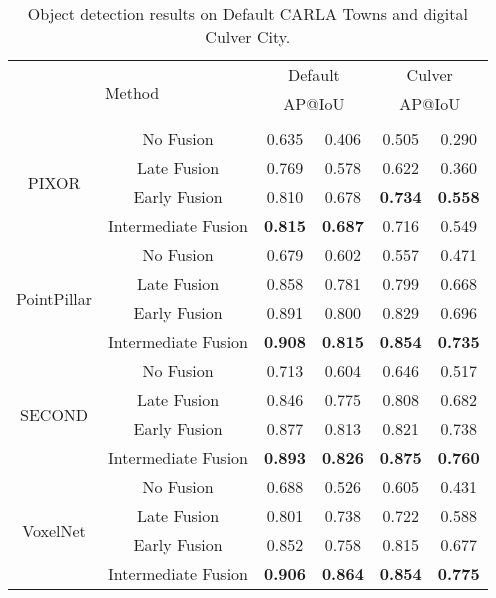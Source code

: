 \documentclass[letterpaper, 10 pt, conference]{ieeeconf}
\begin{document}
\begin{table}[]
    \centering
    \caption{Object detection results on Default CARLA Towns and digital Culver City.}
    \begin{tabular}{c|c|cc|cc}
        \toprule
        \multicolumn{2}{c|}{\multirow{3}{*}{Method}}&\multicolumn{2}{c|}{Default}&\multicolumn{2}{c}{Culver}\\
        \multicolumn{2}{c|}{}&\multicolumn{2}{c|}{AP@IoU}&\multicolumn{2}{c}{AP@IoU}\\
         \multicolumn{2}{c|}{}&&&& \\
         \hline
        \multirow{4}{*}{PIXOR}&No Fusion&0.635 &0.406 &0.505&0.290\\
        &Late Fusion&0.769&0.578&0.622&0.360\\
        &Early Fusion&0.810&0.678&\textbf{0.734}&\textbf{0.558}\\
        &Intermediate Fusion&\textbf{0.815}&\textbf{0.687}&0.716&0.549\\
        \hline
        \multirow{4}{*}{PointPillar}&No Fusion&0.679&0.602&0.557&0.471\\
        &Late Fusion&0.858&0.781&0.799&0.668\\
        &Early Fusion&0.891&0.800&0.829&0.696\\
        &Intermediate Fusion&\textbf{0.908}&\textbf{0.815}&\textbf{0.854}&\textbf{0.735}\\
        \hline
        \multirow{4}{*}{SECOND}&No Fusion&0.713&0.604&0.646&0.517\\
        &Late Fusion&0.846&0.775&0.808&0.682\\
        &Early Fusion&0.877&0.813&0.821&0.738\\
        &Intermediate Fusion&\textbf{0.893}&\textbf{0.826}&\textbf{0.875} &\textbf{0.760}\\
        \hline
        \multirow{4}{*}{VoxelNet}&No Fusion&0.688&0.526&0.605&0.431\\
        &Late Fusion&0.801&0.738&0.722&0.588\\
        &Early Fusion&0.852&0.758&0.815&0.677\\
        &Intermediate Fusion&\textbf{0.906}&\textbf{0.864}&\textbf{0.854}&\textbf{0.775}\\
        \bottomrule
    \end{tabular}
    \label{table:benchmark_analysis}
\end{table}
\end{document}
